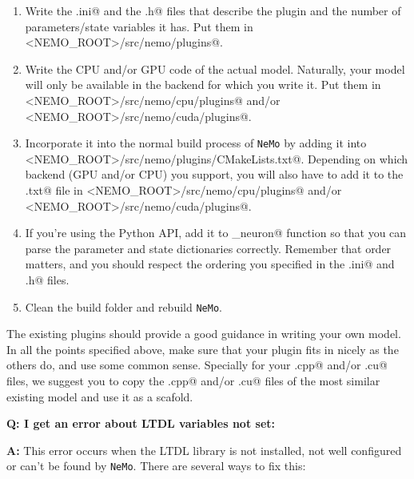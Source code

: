 \documentclass[a4paper]{article}
\newcommand{\nemo}{\texttt{NeMo}\xspace}
\begin{document}
\begin{enumerate}
  
  \item Write the \verb@.ini@ and the \verb@.h@ files that describe the plugin
  and the number of parameters/state variables it has. Put them in
  \verb@<NEMO_ROOT>/src/nemo/plugins@.

  \item Write the CPU and/or GPU code of the actual model. Naturally, your
  model will only be available in the backend for which you write it. Put them
  in \verb@<NEMO_ROOT>/src/nemo/cpu/plugins@ and/or
  \verb@<NEMO_ROOT>/src/nemo/cuda/plugins@.

  \item Incorporate it into the normal build process of \nemo by adding it into
  \verb@<NEMO_ROOT>/src/nemo/plugins/CMakeLists.txt@. Depending on which
  backend (GPU and/or CPU) you support, you will also have to add it to the
  \verb@CMakeLists.txt@ file in \verb@<NEMO_ROOT>/src/nemo/cpu/plugins@ and/or
  \verb@<NEMO_ROOT>/src/nemo/cuda/plugins@.

  \item If you're using the Python API, add it to \verb@add_neuron@ function so
  that you can parse the parameter and state dictionaries correctly. Remember
  that order matters, and you should respect the ordering you specified in the
  \verb@.ini@ and \verb@.h@ files.

  \item Clean the build folder and rebuild \nemo.

\end{enumerate}

The existing plugins should provide a good guidance in writing your own model.
In all the points specified above, make sure that your plugin fits in nicely as
the others do, and use some common sense. Specially for your \verb@.cpp@ and/or
\verb@.cu@ files, we suggest you to copy the \verb@.cpp@ and/or \verb@.cu@ files
of the most similar existing model and use it as a scafold.

\vspace{5pt}
\textbf{Q: I get an error about LTDL variables not set:}

\textbf{A:} This error occurs when the LTDL library is not installed, not well
configured or can't be found by \nemo. There are several ways to fix this:
\end{document}
